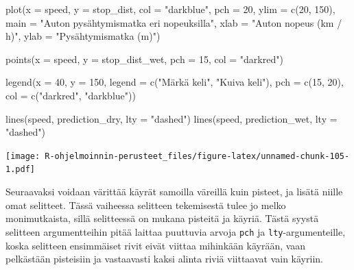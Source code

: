 \documentclass[
]{book}
\newenvironment{Shaded}{\begin{snugshade}}{\end{snugshade}}
\newcommand{\AttributeTok}[1]{\textcolor[rgb]{0.77,0.63,0.00}{#1}}
\newcommand{\DecValTok}[1]{\textcolor[rgb]{0.00,0.00,0.81}{#1}}
\newcommand{\FunctionTok}[1]{\textcolor[rgb]{0.00,0.00,0.00}{#1}}
\newcommand{\NormalTok}[1]{#1}
\newcommand{\StringTok}[1]{\textcolor[rgb]{0.31,0.60,0.02}{#1}}
\begin{document}
\begin{Shaded}
\begin{Highlighting}[]
\FunctionTok{plot}\NormalTok{(}\AttributeTok{x =}\NormalTok{ speed, }\AttributeTok{y =}\NormalTok{ stop\_dist,}
     \AttributeTok{col =} \StringTok{"darkblue"}\NormalTok{, }\AttributeTok{pch =} \DecValTok{20}\NormalTok{,}
     \AttributeTok{ylim =} \FunctionTok{c}\NormalTok{(}\DecValTok{20}\NormalTok{, }\DecValTok{150}\NormalTok{),}
     \AttributeTok{main =} \StringTok{"Auton pysähtymismatka eri nopeuksilla"}\NormalTok{,}
     \AttributeTok{xlab =} \StringTok{"Auton nopeus (km / h)"}\NormalTok{, }\AttributeTok{ylab =} \StringTok{"Pysähtymismatka (m)"}\NormalTok{)}

\FunctionTok{points}\NormalTok{(}\AttributeTok{x =}\NormalTok{ speed, }\AttributeTok{y =}\NormalTok{ stop\_dist\_wet, }\AttributeTok{pch =} \DecValTok{15}\NormalTok{, }\AttributeTok{col =} \StringTok{"darkred"}\NormalTok{)}

\FunctionTok{legend}\NormalTok{(}\AttributeTok{x =} \DecValTok{40}\NormalTok{, }\AttributeTok{y =} \DecValTok{150}\NormalTok{,}
       \AttributeTok{legend =} \FunctionTok{c}\NormalTok{(}\StringTok{"Märkä keli"}\NormalTok{, }\StringTok{"Kuiva keli"}\NormalTok{),}
       \AttributeTok{pch =} \FunctionTok{c}\NormalTok{(}\DecValTok{15}\NormalTok{, }\DecValTok{20}\NormalTok{), }\AttributeTok{col =} \FunctionTok{c}\NormalTok{(}\StringTok{"darkred"}\NormalTok{, }\StringTok{"darkblue"}\NormalTok{))}

\FunctionTok{lines}\NormalTok{(speed, prediction\_dry, }\AttributeTok{lty =} \StringTok{"dashed"}\NormalTok{)}
\FunctionTok{lines}\NormalTok{(speed, prediction\_wet, }\AttributeTok{lty =} \StringTok{"dashed"}\NormalTok{)}
\end{Highlighting}
\end{Shaded}

\texttt{[image: R-ohjelmoinnin-perusteet\_files/figure-latex/unnamed-chunk-105-1.pdf]}

Seuraavaksi voidaan värittää käyrät samoilla väreillä kuin pisteet, ja lisätä niille omat selitteet. Tässä vaiheessa selitteen tekemisestä tulee jo melko monimutkaista, sillä selitteessä on mukana pisteitä ja käyriä. Tästä syystä selitteen argumentteihin pitää laittaa puuttuvia arvoja \texttt{pch} ja \texttt{lty}-argumenteille, koska selitteen ensimmäiset rivit eivät viittaa mihinkään käyrään, vaan pelkästään pisteisiin ja vastaavasti kaksi alinta riviä viittaavat vain käyriin.
\end{document}
